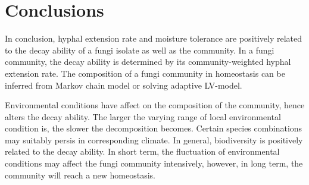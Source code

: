 \section{Conclusions}\label{sec:conclu}

In conclusion, hyphal extension rate and moisture tolerance are positively related to the decay ability of a fungi isolate as well as the community. In a fungi community, the decay ability is determined by its community-weighted hyphal extension rate. The composition of a fungi community in homeostasis can be inferred from Markov chain model or solving adaptive LV-model.

Environmental conditions have affect on the composition of the community, hence alters the decay ability. The larger the varying range of local environmental condition is, the slower the decomposition becomes. Certain species combinations may suitably persis in corresponding climate. In general, biodiversity is positively related to the decay ability. In short term, the fluctuation of environmental conditions may affect the fungi community intensively, however, in long term, the community will reach a new homeostasis.
